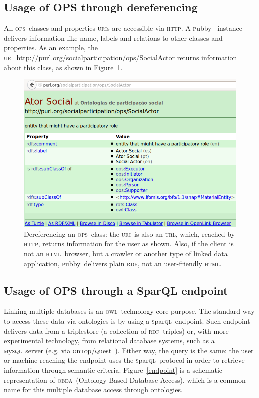 \documentclass[10pt,letterpaper]{article}
\newcommand{\ops}{\textsc{ops}}
\newcommand{\owl}{\textsc{owl}}
\newcommand{\sparql}{\textsc{s}par\textsc{ql}}
\newcommand{\html}{\textsc{html}}
\newcommand{\uri}{\textsc{uri}}
\newcommand{\urll}{\textsc{url}}
\newcommand{\http}{\textsc{http}}
\newcommand{\pubby}{\textsc{p}ubby}
\newcommand{\rdf}{\textsc{rdf}}
\newcommand{\mysql}{\textsc{m}y\textsc{sql}}
\newcommand{\ontop}{\textsc{o}n\textsc{t}op}
\newcommand{\quest}{\textsc{q}uest}
\newcommand{\obda}{\textsc{obda}}
\begin{document}
\subsection{Usage of OPS through dereferencing}
All \ops\ classes and properties \uri s are accessible via \http.
A \pubby~\cite{pubby} instance delivers information like name,
labels and relations to other classes and properties.
As an example, the \uri\ \url{http://purl.org/socialparticipation/ops/SocialActor} returns information about this class,
as shown in Figure~\ref{fig:deref}.
\begin{figure}[!h]
    \centering
    \includegraphics[width=\columnwidth]{figs/pubbyDer}
    \caption{Dereferencing an \ops\ class:
    the \uri\ is also an \urll, which, reached by \http,
    returns information for the user as shown.
    Also, if the client is not an \html\ browser, but a crawler or another type of linked data application,
    \pubby\ delivers plain \rdf, not an user-friendly \html.}
    \label{fig:deref}
\end{figure}

\subsection{Usage of OPS through a SparQL endpoint}
Linking multiple databases is an \owl\ technology core purpose.
The standard way to access these data via ontologies is by using a \sparql\ endpoint.
Such endpoint delivers data from a triplestore (a collection of \rdf\ triples) or,
with more experimental technology, from relational database systems, such as a \mysql\ server 
(e.g. via \ontop/\quest~\cite{onTop}).
Either way, the query is the same:
the user or machine reaching the endpoint uses the \sparql\
protocol in order to retrieve information through semantic criteria.
Figure~\ref{endpoint} is a schematic representation of \obda\ (Ontology Based Database Access),
which is a common name for this multiple database access through ontologies.
\end{document}
